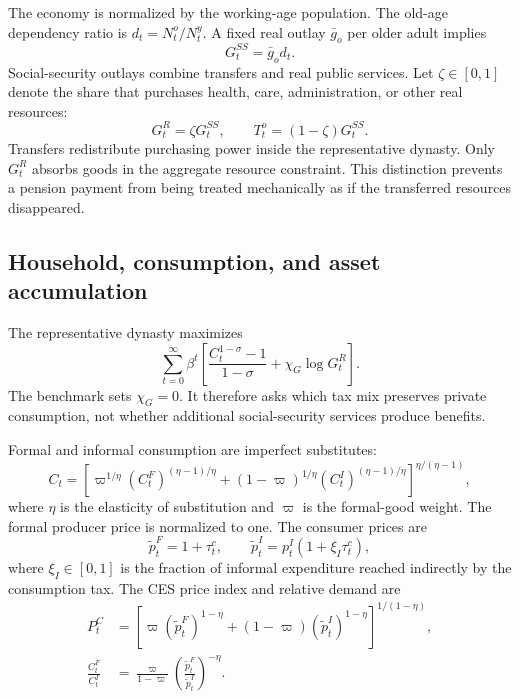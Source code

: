 \documentclass[12pt]{article}
\begin{document}
The economy is normalized by the working-age population. The old-age
dependency ratio is $d_t=N_t^o/N_t^y$. A fixed real outlay $\bar g_o$ per older
adult implies
\begin{equation}
  G_t^{SS}=\bar g_o d_t.
  \label{eq:social_spending}
\end{equation}
Social-security outlays combine transfers and real public services. Let
$\zeta\in[0,1]$ denote the share that purchases health, care, administration,
or other real resources:
\begin{equation}
  G_t^R=\zeta G_t^{SS},
  \qquad
  T_t^o=(1-\zeta)G_t^{SS}.
  \label{eq:resource_transfer_split}
\end{equation}
Transfers redistribute purchasing power inside the representative dynasty.
Only $G_t^R$ absorbs goods in the aggregate resource constraint. This
distinction prevents a pension payment from being treated mechanically as if
the transferred resources disappeared.

\subsection{Household, consumption, and asset accumulation}

The representative dynasty maximizes
\begin{equation}
  \sum_{t=0}^{\infty}\beta^t
  \left[
    \frac{C_t^{1-\sigma}-1}{1-\sigma}
    +\chi_G\log G_t^R
  \right].
  \label{eq:utility}
\end{equation}
The benchmark sets $\chi_G=0$. It therefore asks which tax mix preserves
private consumption, not whether additional social-security services produce
benefits.

Formal and informal consumption are imperfect substitutes:
\begin{equation}
 C_t=
 \left[
   \varpi^{1/\eta}(C_t^F)^{(\eta-1)/\eta}
   +(1-\varpi)^{1/\eta}(C_t^I)^{(\eta-1)/\eta}
 \right]^{\eta/(\eta-1)},
 \label{eq:ces}
\end{equation}
where $\eta$ is the elasticity of substitution and $\varpi$ is the formal-good
weight. The formal producer price is normalized to one. The consumer prices
are
\begin{equation}
 \widetilde p_t^F=1+\tau_t^c,
 \qquad
 \widetilde p_t^I=p_t^I(1+\xi_I\tau_t^c),
 \label{eq:consumer_prices}
\end{equation}
where $\xi_I\in[0,1]$ is the fraction of informal expenditure reached
indirectly by the consumption tax. The CES price index and relative demand
are
\begin{align}
 P_t^C
 &=
 \left[
   \varpi(\widetilde p_t^F)^{1-\eta}
   +(1-\varpi)(\widetilde p_t^I)^{1-\eta}
 \right]^{1/(1-\eta)},                                      \label{eq:price_index}\\
 \frac{C_t^F}{C_t^I}
 &=
 \frac{\varpi}{1-\varpi}
 \left(\frac{\widetilde p_t^F}{\widetilde p_t^I}\right)^{-\eta}.
 \label{eq:relative_demand}
\end{align}
\end{document}
